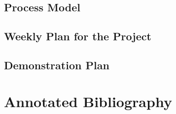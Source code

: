\documentclass[11pt,fleqn,twoside]{article}
\begin{document}
\subsection{Process Model}

\subsection{Weekly Plan for the Project}

\subsection{Demonstration Plan}

\section*{Annotated Bibliography}




\renewcommand{\refname}{}  %
\end{document}
